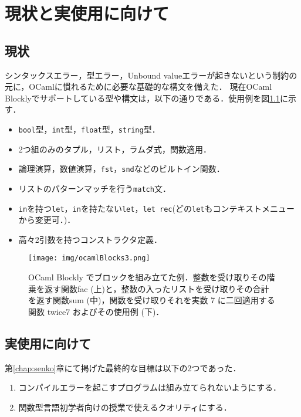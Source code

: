 \chapter {現状と実使用に向けて}\label{chap:todo}

\section {現状}\label{sub:genjo}

シンタックスエラー，型エラー，Unbound valueエラーが起きないという制約の元に，OCamlに慣れるために必要な基礎的な構文を備えた．
現在OCaml Blocklyでサポートしている型や構文は，以下の通りである．使用例を図\ref{fig:ocamlBlocks}に示す．
\begin{itemize}
  \item {\tt bool}型，{\tt int}型，{\tt float}型，{\tt string}型．
  \item 2つ組のみのタプル，リスト，ラムダ式，関数適用．
  \item 論理演算，数値演算，{\tt fst}，{\tt snd}などのビルトイン関数．
  \item リストのパターンマッチを行う{\tt match}文．
  \item {\tt in}を持つ{\tt let}，{\tt in}を持たない{\tt let}，{\tt let rec}(どの{\tt let}もコンテキストメニューから変更可．)．
  \item 高々2引数を持つコンストラクタ定義．
\end{itemize}

\begin{figure}[h]
 \centering
 \texttt{[image: img/ocamlBlocks3.png]}
 \caption{OCaml Blockly でブロックを組み立てた例．整数を受け取りその階乗を返す関数fac (上)と，整数の入ったリストを受け取りその合計を返す関数sum (中)，関数を受け取りそれを実数 7 に二回適用する関数 twice7 およびその使用例 (下)．\label{fig:ocamlBlocks}}
\end{figure}

\section {実使用に向けて}\label{sub:later}

第\ref{chap:senko}章にて掲げた最終的な目標は以下の2つであった．
\begin {enumerate}
  \item コンパイルエラーを起こすプログラムは組み立てられないようにする．
  \item 関数型言語初学者向けの授業で使えるクオリティにする．
\end {enumerate}

